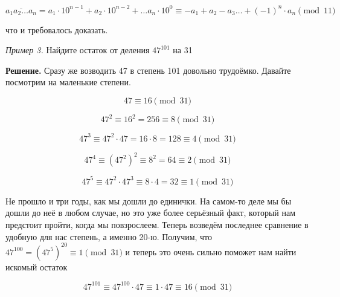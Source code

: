 \begin{enumerate}
    $$
    \overline{a_1a_2\ldots a_n} = a_1\cdot 10^{n-1} + a_2 \cdot 10^{n-2} + \ldots a_n \cdot10^0 \equiv -a_1 + a_2 -a_3\ldots + (-1)^n\cdot a_n \pmod{11}
    $$

    что и требовалось доказать.
    
    \textit{Пример 3.}
    Найдите остаток от деления $47^{101}$ на 31

    \textbf{Решение.}
    Сразу же возводить 47 в степень 101 довольно трудоёмко. Давайте посмотрим на маленькие степени.

    $$
    47 \equiv 16 \pmod{31}
    $$

    $$
    47^2 \equiv 16^2 = 256 \equiv 8 \pmod{31}
    $$

    $$
    47^3 \equiv 47^2\cdot47 = 16 \cdot 8 = 128 \equiv 4 \pmod{31}
    $$

    $$
    47^4 \equiv (47^2)^2 \equiv 8^2  = 64 \equiv 2\pmod{31}
    $$

    $$
    47^5 \equiv 47^2 \cdot 47^3 \equiv 8\cdot4 = 32 \equiv 1\pmod{31}
    $$

    Не прошло и три годы, как мы дошли до единички. На самом-то деле мы бы дошли до неё в любом случае, но это уже более серьёзный факт, который нам предстоит пройти, когда мы повзрослеем. Теперь возведём последнее сравнение в удобную для нас степень, а именно 20-ю. Получим, что $47^{100} = (47^{5})^{20} \equiv 1 \pmod{31}$ и теперь это очень сильно поможет нам найти искомый остаток

    $$
    47^{101} \equiv 47^{100}\cdot47 \equiv 1\cdot47 \equiv16 \pmod{31}
    $$
\end{enumerate}
